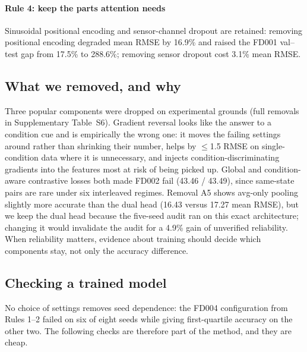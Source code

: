 \paragraph{Rule 4: keep the parts attention needs} Sinusoidal positional
encoding and sensor-channel dropout are retained: removing positional
encoding degraded mean RMSE by 16.9\% and raised the FD001 val--test gap from
17.5\% to 288.6\%; removing sensor dropout cost 3.1\% mean RMSE.

\subsection{What we removed, and why}
\label{sec:method_prune}

Three popular components were dropped on experimental grounds (full
removals in Supplementary Table~S6). Gradient reversal
\cite{ganin2016domain} looks like the answer to a condition cue and is
empirically the wrong one: it moves the failing settings around rather than
shrinking their number, helps by $\le$1.5 RMSE on single-condition data
where it is unnecessary, and injects condition-discriminating gradients into
the features most at risk of being picked up. Global and condition-aware
contrastive losses \cite{ragab2022contrastive} both made FD002 fail (43.46 /
43.49), since same-state pairs are rare under six interleaved regimes.
Removal A5 shows avg-only pooling slightly more accurate than the dual head
(16.43 versus 17.27 mean RMSE), but we keep the dual head because the
five-seed audit ran on this exact architecture; changing it would invalidate
the audit for a 4.9\% gain of unverified reliability. When reliability
matters, evidence about training should decide which components stay, not
only the accuracy difference.

\subsection{Checking a trained model}
\label{sec:method_audit}

No choice of settings removes seed dependence: the FD004 configuration from
Rules 1--2 failed on six of eight seeds while giving first-quartile accuracy
on the other two. The following checks are therefore part of the method,
and they are cheap.

